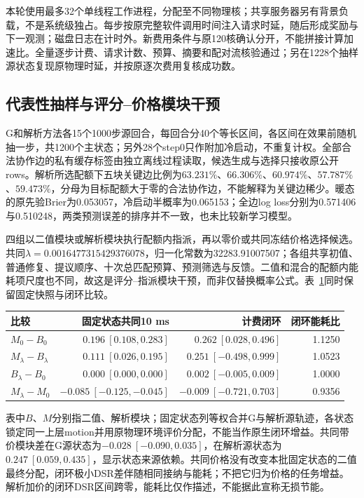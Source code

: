 本轮使用最多32个单线程工作进程，分配至不同物理核；共享服务器另有背景负载，不是系统级独占。每步按原完整软件调用时间注入请求时延，随后形成奖励与下一观测；磁盘日志在计时外。新费用条件与原120核确认分开，不能拼接计算加速比。全量逐步计费、请求计数、预算、摘要和配对流核验通过；另在1228个抽样源状态复现原物理时延，并按原逐次费用复核成功数。

\subsection{代表性抽样与评分--价格模块干预}

G和解析方法各15个1000步源回合，每回合分40个等长区间，各区间在效果前随机抽一步，共1200个主状态；另外28个step0只作附加冷启动，不重复计权。全部合法协作边的私有缓存标签由独立离线过程读取，候选生成与选择只接收原公开rows。解析所选配额下五块关键边比例为$63.231\%$、$66.306\%$、$60.974\%$、$57.787\%$、$59.473\%$，分母为目标配额大于零的合法协作边，不能解释为关键边稀少。暖态的原先验Brier为0.053057，冷启动半概率为0.065153；全边log loss分别为0.571406与0.510248，两类预测误差的排序并不一致，也未比较新学习模型。

四组以二值模块或解析模块执行配额内指派，再以零价或共同冻结价格选择候选。共同$\lambda=0.0016477315429376078$，归一化常数为32283.91007507；各组共享初值、普通修复、提议顺序、十次总匹配预算、预测筛选与反馈。二值和混合的配额内能耗项尺度也不同，故这是评分--指派模块干预，而非仅替换概率公式。表~\ref{tab:cost-stage-b-components}同时保留固定快照与闭环比较。

\begin{table}[!htbp]
\centering
{}
\label{tab:cost-stage-b-components}
\small
\begin{tabular}{lrrr}
\toprule
比较 & 固定状态共同10 ms & 计费闭环 & 闭环能耗比\\
\midrule
$M_0-B_0$ & $0.196\ [0.108,0.283]$ & $0.262\ [0.028,0.496]$ & 1.1250\\
$M_\lambda-B_\lambda$ & $0.111\ [0.026,0.195]$ & $0.251\ [-0.498,0.999]$ & 1.0523\\
$B_\lambda-B_0$ & $0.000\ [0.000,0.000]$ & $0.002\ [-0.005,0.009]$ & 1.0000\\
$M_\lambda-M_0$ & $-0.085\ [-0.125,-0.045]$ & $-0.009\ [-0.721,0.703]$ & 0.9356\\
\bottomrule
\end{tabular}
\end{table}

表中$B$、$M$分别指二值、解析模块；固定状态列等权合并G与解析源轨迹，各状态锁定同一上层motion并用原物理环境评价分配，不能当作原生闭环增益。共同带价模块差在G源状态为$-0.028\ [-0.090,0.035]$，在解析源状态为$0.247\ [0.059,0.435]$，显示状态来源依赖。共同价格没有改变本批固定状态的二值最终分配，闭环极小DSR差伴随相同接纳与能耗；不把它归为价格的任务增益。解析加价的闭环DSR区间跨零，能耗比仅作描述，不能据此宣称无损节能。


